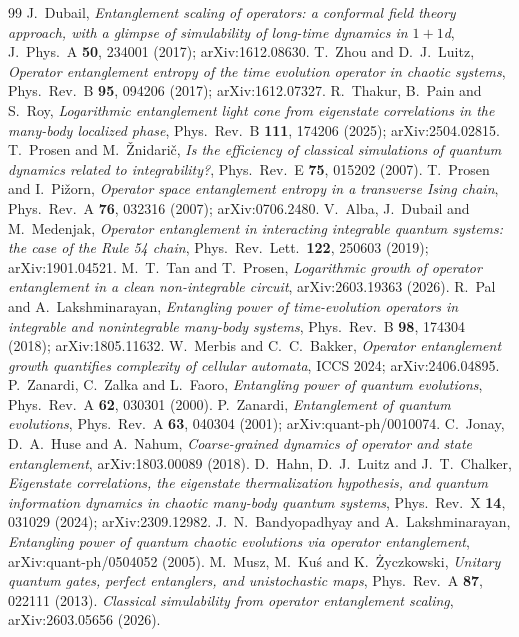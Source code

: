 \documentclass[11pt]{article}
\theoremstyle{plain}
\theoremstyle{remark}
\begin{document}
\begin{thebibliography}{99}
 J.~Dubail,
  \emph{Entanglement scaling of operators: a conformal field theory approach,
  with a glimpse of simulability of long-time dynamics in $1+1$d},
  J.\ Phys.\ A \textbf{50}, 234001 (2017); arXiv:1612.08630.
 T.~Zhou and D.~J.~Luitz,
  \emph{Operator entanglement entropy of the time evolution operator in chaotic
  systems}, Phys.\ Rev.\ B \textbf{95}, 094206 (2017); arXiv:1612.07327.
 R.~Thakur, B.~Pain and S.~Roy,
  \emph{Logarithmic entanglement light cone from eigenstate correlations in the
  many-body localized phase}, Phys.\ Rev.\ B \textbf{111}, 174206 (2025);
  arXiv:2504.02815.
 T.~Prosen and M.~\v{Z}nidari\v{c},
  \emph{Is the efficiency of classical simulations of quantum dynamics related
  to integrability?}, Phys.\ Rev.\ E \textbf{75}, 015202 (2007).
 T.~Prosen and I.~Pi\v{z}orn,
  \emph{Operator space entanglement entropy in a transverse Ising chain},
  Phys.\ Rev.\ A \textbf{76}, 032316 (2007); arXiv:0706.2480.
 V.~Alba, J.~Dubail and M.~Medenjak,
  \emph{Operator entanglement in interacting integrable quantum systems: the
  case of the Rule 54 chain},
  Phys.\ Rev.\ Lett.\ \textbf{122}, 250603 (2019); arXiv:1901.04521.
 M.~T.~Tan and T.~Prosen,
  \emph{Logarithmic growth of operator entanglement in a clean non-integrable
  circuit}, arXiv:2603.19363 (2026).
 R.~Pal and A.~Lakshminarayan,
  \emph{Entangling power of time-evolution operators in integrable and
  nonintegrable many-body systems},
  Phys.\ Rev.\ B \textbf{98}, 174304 (2018); arXiv:1805.11632.
 W.~Merbis and C.~C.~Bakker,
  \emph{Operator entanglement growth quantifies complexity of cellular
  automata}, ICCS 2024; arXiv:2406.04895.
 P.~Zanardi, C.~Zalka and L.~Faoro,
  \emph{Entangling power of quantum evolutions},
  Phys.\ Rev.\ A \textbf{62}, 030301 (2000).
 P.~Zanardi,
  \emph{Entanglement of quantum evolutions},
  Phys.\ Rev.\ A \textbf{63}, 040304 (2001); arXiv:quant-ph/0010074.
 C.~Jonay, D.~A.~Huse and A.~Nahum,
  \emph{Coarse-grained dynamics of operator and state entanglement},
  arXiv:1803.00089 (2018).
 D.~Hahn, D.~J.~Luitz and J.~T.~Chalker,
  \emph{Eigenstate correlations, the eigenstate thermalization hypothesis, and
  quantum information dynamics in chaotic many-body quantum systems},
  Phys.\ Rev.\ X \textbf{14}, 031029 (2024); arXiv:2309.12982.
 J.~N.~Bandyopadhyay and A.~Lakshminarayan,
  \emph{Entangling power of quantum chaotic evolutions via operator
  entanglement}, arXiv:quant-ph/0504052 (2005).
 M.~Musz, M.~Ku\'s and K.~\.Zyczkowski,
  \emph{Unitary quantum gates, perfect entanglers, and unistochastic maps},
  Phys.\ Rev.\ A \textbf{87}, 022111 (2013).
 \emph{Classical simulability from operator entanglement
  scaling}, arXiv:2603.05656 (2026).
\end{thebibliography}
\end{document}
